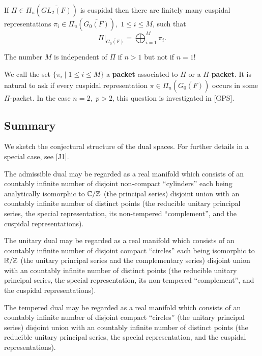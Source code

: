 \begin{lemma}
If $\Pi \in \Pi _u(\overline{GL_2(F)})$ is cuspidal then there are finitely
many cuspidal representations $\pi _i\in \Pi _u(\overline{G_0(F)}),\;1\leq
i\leq M$, such that 
\[
\Pi |_{\overline{G_0(F)}}=\bigoplus_{i=1}^M\pi _i.
\]
\end{lemma}

\begin{remark}
The number $M$ is independent of $\Pi $ if $n>1$ but not if $n=1$!
\end{remark}

We call the set $\{\pi _i\;|\;1\leq i\leq M\}$ a {\bf packet} associated to $%
\Pi $ or a $\Pi $-{\bf packet}. It is natural to ask if every cuspidal
representation $\pi \in \Pi _u(\overline{G_0(F)})$ occurs in some
$\Pi $-packet. In the case $n=2$,\ $p>2$, this question is
investigated in [GPS].

\subsection{Summary}

We sketch the conjectural structure of the dual spaces. For further details
in a special case, see [J1].

The admissible dual may be regarded as a real manifold which consists of an
countably infinite number of disjoint non-compact ``cylinders'' each being
analytically isomorphic to ${\Bbb C}/{\Bbb Z}$ (the principal series)
disjoint union with an countably infinite number of distinct points (the
reducible unitary principal series, the special representation, its
non-tempered ``complement'', and the cuspidal representations).

The unitary dual may be regarded as a real manifold which consists of an
countably infinite number of disjoint compact ``circles'' each being
isomorphic to ${\Bbb R}/{\Bbb Z}$ (the unitary principal series and the
complementary series) disjoint union with an countably infinite number of
distinct points (the reducible unitary principal series, the special
representation, its non-tempered ``complement'', and the cuspidal
representations).

The tempered dual may be regarded as a real manifold which consists of an
countably infinite number of disjoint compact ``circles'' (the unitary
principal series) disjoint union with an countably infinite number of
distinct points (the reducible unitary principal series, the special
representation, and the cuspidal representations).


